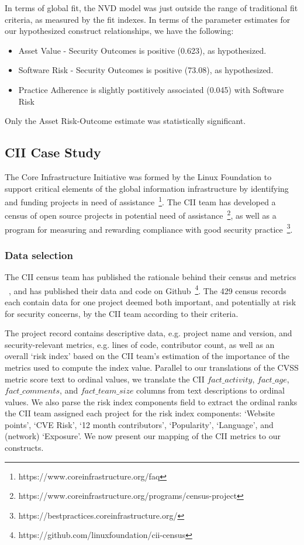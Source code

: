 In terms of global fit, the NVD model was just outside the range of traditional fit criteria, as measured by the fit indexes. In terms of the parameter estimates for our hypothesized  construct relationships, we have the following:
\begin{itemize}
	\item  Asset Value - Security Outcomes is positive (0.623), as hypothesized.
	\item Software Risk - Security Outcomes is positive (73.08), as hypothesized. 
	\item Practice Adherence is slightly postitively associated (0.045) with Software Risk 
\end{itemize}	
	  Only the Asset Risk-Outcome estimate was statistically significant. 

\subsection{CII Case Study}

The Core Infrastructure Initiative was formed by the Linux Foundation to support critical elements of the global information infrastructure by identifying and funding projects in need of assistance~\footnote{https://www.coreinfrastructure.org/faq}. The CII team has developed a census of open source projects in potential need of assistance~\footnote{https://www.coreinfrastructure.org/programs/census-project}, as well as a program for measuring and rewarding compliance with good security practice~\footnote{https://bestpractices.coreinfrastructure.org/}.

\subsubsection{Data selection}
The CII census team has published the rationale behind their census and metrics ~\cite{wheeler2015open}, and has published their data and code on Github~\footnote{https://github.com/linuxfoundation/cii-census}. The 429 census records each contain data for one project deemed both important, and potentially at risk for security concerns, by the CII team according to their criteria.

The project record contains descriptive data, e.g. project name and version, and security-relevant metrics, e.g. lines of code, contributor count, as well as an overall `risk index' based on the CII team's estimation of the importance of the metrics used to compute the index value.  Parallel to our translations of the CVSS metric score text to ordinal values, we translate the CII $fact\_activity$, $fact\_age$, $fact\_comments$, and $fact\_team\_size$ columns from text descriptions to ordinal values. We also parse the risk index components field to extract the ordinal ranks the CII team assigned each project for the risk index components: `Website points', `CVE Risk', `12 month contributors', `Popularity', `Language', and (network) `Exposure'. We now present our mapping of the CII metrics to our constructs.

